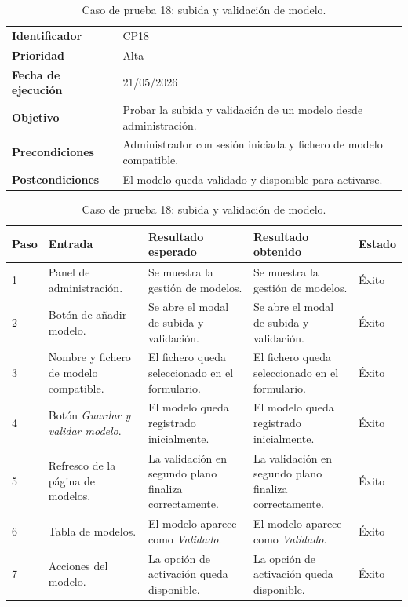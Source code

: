\begin{table}[]
	\centering
	\footnotesize
	\renewcommand{\arraystretch}{1.2}
	\begin{tabularx}{\textwidth}{p{3.2cm} X}
		\toprule
		\textbf{Identificador} & CP18 \\
		\textbf{Prioridad} & Alta \\
		\textbf{Fecha de ejecución} & 21/05/2026 \\
		\textbf{Objetivo} & Probar la subida y validación de un modelo desde administración. \\
		\textbf{Precondiciones} & Administrador con sesión iniciada y fichero de modelo compatible. \\
		\textbf{Postcondiciones} & El modelo queda validado y disponible para activarse. \\
		\midrule
	\end{tabularx}
	\begin{tabularx}{\textwidth}{p{0.8cm} p{3.2cm} X X p{1.3cm}}
		\textbf{Paso} & \textbf{Entrada} & \textbf{Resultado esperado} & \textbf{Resultado obtenido} & \textbf{Estado} \\
		\midrule
		1 & Panel de administración. & Se muestra la gestión de modelos. & Se muestra la gestión de modelos. & Éxito \\
		2 & Botón de añadir modelo. & Se abre el modal de subida y validación. & Se abre el modal de subida y validación. & Éxito \\
		3 & Nombre y fichero de modelo compatible. & El fichero queda seleccionado en el formulario. & El fichero queda seleccionado en el formulario. & Éxito \\
		4 & Botón \textit{Guardar y validar modelo}. & El modelo queda registrado inicialmente. & El modelo queda registrado inicialmente. & Éxito \\
		5 & Refresco de la página de modelos. & La validación en segundo plano finaliza correctamente. & La validación en segundo plano finaliza correctamente. & Éxito \\
		6 & Tabla de modelos. & El modelo aparece como \textit{Validado}. & El modelo aparece como \textit{Validado}. & Éxito \\
		7 & Acciones del modelo. & La opción de activación queda disponible. & La opción de activación queda disponible. & Éxito \\
		\bottomrule
	\end{tabularx}
	\caption{Caso de prueba 18: subida y validación de modelo.}
	\label{tab:cp18}
\end{table}
